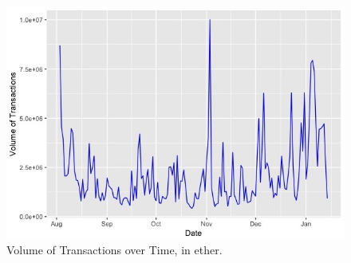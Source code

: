 \begin{figure}[h]
  \centering
  \includegraphics[width=\linewidth]{figures/volume_over_time.jpeg}
  \caption{Volume of Transactions over Time, in ether.}
  \label{fig:volume_over_time}
\end{figure}


